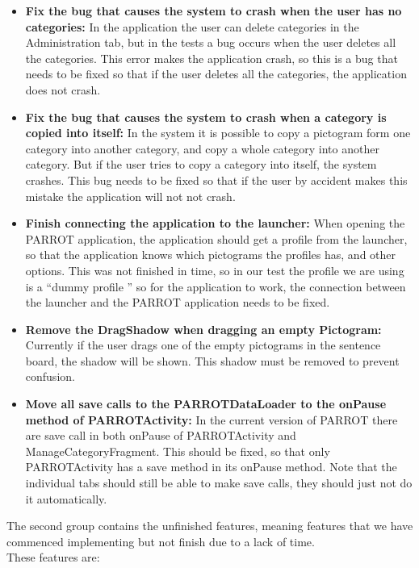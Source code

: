 \begin{itemize}
	\item \textbf{Fix the bug that causes the system to crash when the user has no categories:} In the application the user can delete categories in the Administration tab, but in the tests a bug occurs when the user deletes all the categories. This error makes the application crash, so this is a bug that needs to be fixed so that if the user deletes all the categories, the application does not crash.
	
	\item \textbf{Fix the bug that causes the system to crash when a category is copied into itself:} In the system it is possible to copy a pictogram form one category into another category, and copy a whole category into another category. But if the user tries to copy a category into itself, the system crashes. This bug needs to be fixed so that if the user by accident makes this mistake the application will not not crash. 
	
	\item \textbf{Finish connecting the application to the launcher:} When opening the PARROT application, the application should get a profile from the launcher, so that the application knows which pictograms the profiles has, and other options. This was not finished in time, so in our test the profile we are using is a ``dummy profile '' so for the application to work, the connection between the launcher and the PARROT application needs to be fixed. 
	
	\item \textbf{Remove the DragShadow when dragging an empty Pictogram:} Currently if the user drags one of the empty pictograms in the sentence board, the shadow will be shown. This shadow must be removed to prevent confusion.
	
	\item \textbf{Move all save calls to the PARROTDataLoader to the onPause method of PARROTActivity:} In the current version of PARROT there are save call in both onPause of PARROTActivity and ManageCategoryFragment. This should be fixed, so that only PARROTActivity has a save method in its onPause method. Note that the individual tabs should still be able to make save calls, they should just not do it automatically.
\end{itemize}
  
The second group contains the unfinished features, meaning features that we have commenced implementing but not finish due to a lack of time.   
\\
These features are:

